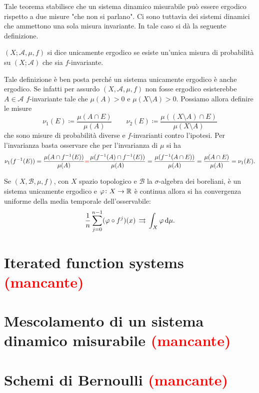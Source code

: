Tale teorema stabilisce che un sistema dinamico misurabile può essere ergodico rispetto a due misure "che non si parlano". Ci sono tuttavia dei sistemi dinamici che ammettono una sola misura invariante. In tale caso si dà la seguente definizione.

\begin{definition}
    $ (X; \mathcal{A}, \mu, f) $ si dice unicamente ergodico se esiste un'unica misura di probabilità su $ (X; \mathcal{A}) $ che sia $ f $-invariante.
\end{definition}

Tale definizione è ben posta perché un sistema unicamente ergodico è anche ergodico. Se infatti per assurdo $ (X, \mathcal{A}, \mu, f) $ non fosse ergodico esisterebbe $ A \in \mathcal{A} $ $ f $-invariante tale che $ \mu(A) > 0 $ e $ \mu(X \setminus A) > 0 $. Possiamo allora definire le misure 
\[
\nu_1(E) \coloneqq \frac{\mu(A \cap E)}{\mu(A)} 
\qquad 
\nu_2(E) \coloneqq \frac{\mu((X \setminus A) \cap E)}{\mu(X \setminus A)}
\] 
che sono misure di probabilità diverse e $ f $-invarianti contro l'ipotesi. Per l'invarianza basta osservare che per l'invarianza di $ \mu $ si ha
\[
\nu_1(f^{-1}(E)) = \frac{\mu(A \cap f^{-1}(E))}{\mu(A)} \textcolor{red}{=} \frac{\mu(f^{-1}(A) \cap f^{-1}(E))}{\mu(A)} = \frac{\mu(f^{-1}(A \cap E))}{\mu(A)} = \frac{\mu(A \cap E)}{\mu(A)} = \nu_1(E).
\] 

\begin{thm}
    Se $ (X, \mathcal{B}, \mu, f) $, con $ X $ spazio topologico e $ \mathcal{B} $ la $ \sigma $-algebra dei boreliani, è un sistema unicamente ergodico e $ \varphi \colon X \to \mathbb{R} $ è continua allora si ha convergenza uniforme della media temporale dell'osservabile:
    \[
    \frac{1}{n} \sum_{j=0}^{n-1} (\varphi \circ f^j)(x) \, \touf \, \int_X \varphi \dif{\mu}.
    \]
\end{thm}

\section{Iterated function systems \textcolor{red}{(mancante)}}

\section{Mescolamento di un sistema dinamico misurabile \textcolor{red}{(mancante)}}

\section{Schemi di Bernoulli \textcolor{red}{(mancante)}}

